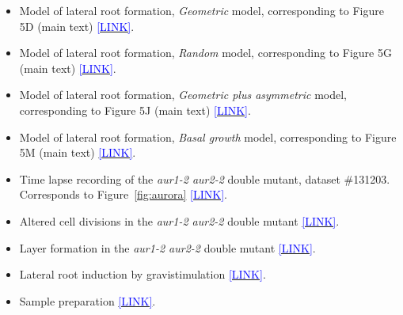 \documentclass[11pt,a4paper, final]{article}
\newcommand{\TODO}[1]{
\textcolor{red}{TODO:#1}
}
\newenvironment{Itemize}{
 \begin{itemize}[leftmargin=0.5cm]{
}}{\end{itemize}}
\begin{document}
\begin{Itemize}
\begin{Itemize}
    \item Dataset \#121204 \href{http://youtu.be/Bd_UgUVyzrM}{\textcolor{blue}{[LINK]}}.
    \item Dataset \#121211 \href{http://youtu.be/NOouEVqpGj8}{\textcolor{blue}{[LINK]}}.
    \item Dataset \#130508 \href{http://youtu.be/EajarNlRvtA}{\textcolor{blue}{[LINK]}}.
  \end{Itemize}
  \TODO{@Alexis: update model movies such that only the four models are shown: replace ``Geometric plus asymmetric'' by ``1st random then geometric''}
  \item Model of lateral root formation, \emph{Geometric} model, corresponding to Figure 5D (main text) \href{https://youtu.be/GLUKCE4nN3A}{\textcolor{blue}{[LINK]}}.
  \item Model of lateral root formation, \emph{Random} model, corresponding to Figure 5G (main text) \href{https://youtu.be/V9xkyPfRQeM}{\textcolor{blue}{[LINK]}}.
  \item Model of lateral root formation, \emph{Geometric plus asymmetric} model, corresponding to Figure 5J (main text) \href{https://youtu.be/ypBdyjFyqYw}{\textcolor{blue}{[LINK]}}.
  \item Model of lateral root formation, \emph{Basal growth} model, corresponding to Figure 5M (main text) \href{https://youtu.be/TZqwYTnmAgg}{\textcolor{blue}{[LINK]}}.

  \item Time lapse recording of the \emph{aur1-2 aur2-2} double mutant, dataset \#131203. Corresponds to Figure~\ref{fig:aurora} \href{http://youtu.be/y8b-0J4lPHg}{\textcolor{blue}{[LINK]}}.
  \item Altered cell divisions in the \emph{aur1-2 aur2-2} double mutant \href{http://youtu.be/kkQZub-puVI}{\textcolor{blue}{[LINK]}}.
  \item Layer formation in the \emph{aur1-2 aur2-2} double mutant \href{http://youtu.be/FH5BJ177TGk}{\textcolor{blue}{[LINK]}}.
  \item Lateral root induction by gravistimulation \href{http://youtu.be/sLvVCbWye-E}{\textcolor{blue}{[LINK]}}.
  \item Sample preparation \href{https://youtu.be/uFdOIjmO9vI}{\textcolor{blue}{[LINK]}}.
\end{Itemize}

\clearpage
\end{document}

